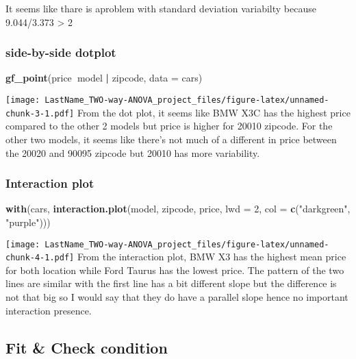\documentclass[]{article}
\newenvironment{Shaded}{\begin{snugshade}}{\end{snugshade}}
\newcommand{\DataTypeTok}[1]{\textcolor[rgb]{0.13,0.29,0.53}{#1}}
\newcommand{\DecValTok}[1]{\textcolor[rgb]{0.00,0.00,0.81}{#1}}
\newcommand{\KeywordTok}[1]{\textcolor[rgb]{0.13,0.29,0.53}{\textbf{#1}}}
\newcommand{\NormalTok}[1]{#1}
\newcommand{\OperatorTok}[1]{\textcolor[rgb]{0.81,0.36,0.00}{\textbf{#1}}}
\newcommand{\StringTok}[1]{\textcolor[rgb]{0.31,0.60,0.02}{#1}}
\begin{document}
It seems like thare is aproblem with standard deviation variabilty
because 9.044/3.373 \textgreater{} 2

\hypertarget{side-by-side-dotplot}{%
\subsubsection{side-by-side dotplot}\label{side-by-side-dotplot}}

\begin{Shaded}
\begin{Highlighting}[]
\KeywordTok{gf_point}\NormalTok{(price}\OperatorTok{~}\NormalTok{model }\OperatorTok{|}\StringTok{ }\NormalTok{zipcode, }\DataTypeTok{data =}\NormalTok{ cars)}
\end{Highlighting}
\end{Shaded}

\texttt{[image: LastName\_TWO-way-ANOVA\_project\_files/figure-latex/unnamed-chunk-3-1.pdf]}
From the dot plot, it seems like BMW X3C has the highest price compared
to the other 2 models but price is higher for 20010 zipcode. For the
other two models, it seems like there's not much of a different in price
between the 20020 and 90095 zipcode but 20010 has more variability.

\hypertarget{interaction-plot}{%
\subsubsection{Interaction plot}\label{interaction-plot}}

\begin{Shaded}
\begin{Highlighting}[]
\KeywordTok{with}\NormalTok{(cars, }\KeywordTok{interaction.plot}\NormalTok{(model, zipcode, price, }\DataTypeTok{lwd =} \DecValTok{2}\NormalTok{, }\DataTypeTok{col =} \KeywordTok{c}\NormalTok{(}\StringTok{"darkgreen"}\NormalTok{, }\StringTok{"purple"}\NormalTok{)))}
\end{Highlighting}
\end{Shaded}

\texttt{[image: LastName\_TWO-way-ANOVA\_project\_files/figure-latex/unnamed-chunk-4-1.pdf]}
From the interaction plot, BMW X3 has the highest mean price for both
location while Ford Taurus has the lowest price. The pattern of the two
lines are similar with the first line has a bit different slope but the
difference is not that big so I would say that they do have a parallel
slope hence no important interaction presence.

\hypertarget{fit-check-condition}{%
\subsection{Fit \& Check condition}\label{fit-check-condition}}
\end{document}
